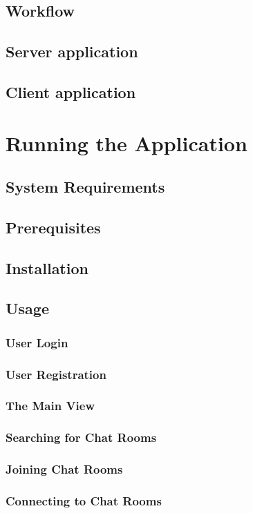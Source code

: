 \documentclass[a4paper,11pt]{article}
\begin{document}
\subsection{Workflow}
\subsection{Server application}

\subsection{Client application}
\section{Running the Application}
\subsection{System Requirements}
\subsection{Prerequisites}
\subsection{Installation}
\subsection{Usage}
\subsubsection{User Login}
\subsubsection{User Registration}
\subsubsection{The Main View}
\subsubsection{Searching for Chat Rooms}
\subsubsection{Joining Chat Rooms}
\subsubsection{Connecting to Chat Rooms}
\end{document}
